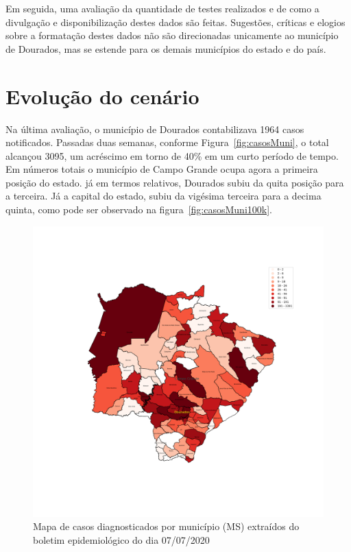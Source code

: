 \documentclass[12pt]{article}
\begin{document}
Em seguida, uma avaliação da quantidade de testes realizados e de como a divulgação e disponibilização destes dados são feitas. Sugestões, críticas e elogios sobre a formatação destes dados não são direcionadas unicamente ao município de Dourados, mas se estende para os demais municípios do estado e do país.

\section{Evolução do cenário}\label{sec:dados}

Na última avaliação, o município de Dourados contabilizava 1964 casos notificados. Passadas duas semanas, conforme Figura~\ref{fig:casosMuni}, o total alcançou 3095, um acréscimo em torno de 40\% em um curto período de tempo. Em números totais o município de Campo Grande ocupa agora a primeira posição do estado. já em termos relativos, Dourados subiu da quita posição para a terceira. Já a capital do estado, subiu da vigésima terceira para a decima quinta, como pode ser observado na figura~\ref{fig:casosMuni100k}.

\begin{figure}[!htb]
  \centering
  \includegraphics[width=1\textwidth]{figs/mapa_casos_registrados.png}
  \caption{Mapa de casos diagnosticados por município (MS) extraídos do boletim epidemiológico do dia 07/07/2020}
  \label{fig:mapaCasos}
  \end{figure}
\end{document}
